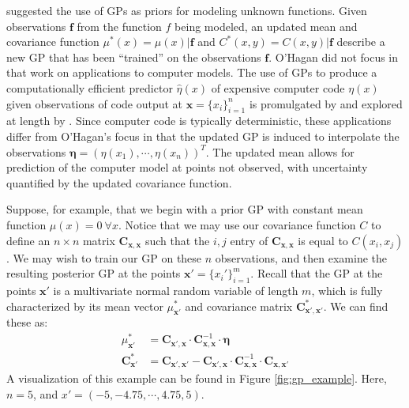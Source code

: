 \documentclass{article}
\begin{document}

\cite{OHagan1978} suggested the use of GPs as priors for modeling unknown functions. Given observations $\mathbf f$ from the function $f$ being modeled, an updated mean and covariance function $\mu^*(x)=\mu(x)|\mathbf f$ and $C^*(x,y) = C(x,y)|\mathbf f$ describe a new GP that has been ``trained'' on the observations $\mathbf f$. O'Hagan did not focus in that work on applications to computer models. The use of GPs to produce a computationally efficient predictor $\hat \eta (x)$ of expensive computer code $\eta(x)$ given observations of code output at $\mathbf x=\{x_i\}_{i=1}^n$ is promulgated by \cite{Sacks1989} and explored at length by \cite{Santner2003a}. Since computer code is typically deterministic, these applications differ from O'Hagan's focus in that the updated GP is induced to interpolate the observations $\boldsymbol \eta = (\eta(x_1),\cdots,\eta(x_n))^T$. The updated mean allows for prediction of the computer model at points not observed, with uncertainty quantified by the updated covariance function.

Suppose, for example, that we begin with a prior GP with constant mean function $\mu(x)=0\ \forall x$. Notice that we may use our covariance function $C$ to define an $n\times n$ matrix $\mathbf C_{\mathbf x,\mathbf x}$ such that the $i,j$ entry of $\mathbf C_{\mathbf x,\mathbf x}$ is equal to $C(x_i,x_j)$. We may wish to train our GP on these $n$ observations, and then examine the resulting posterior GP at the points $\mathbf x'=\{x_i' \}_{i=1}^m$. Recall that the GP at the points $\mathbf x'$ is a multivariate normal random variable of length $m$, which is fully characterized by its mean vector $\mu^*_{\mathbf x'}$ and covariance matrix $\mathbf C^*_{\mathbf x',\mathbf x'}$. We can find these as:
\begin{equation}\label{eq:post_gp}\begin{split}
\mu^*_{\mathbf x'}&=\mathbf C_{\mathbf x',\mathbf x}\cdot \mathbf C_{\mathbf x,\mathbf x} ^{-1}\cdot \boldsymbol \eta
\\
\mathbf C^*_{\mathbf x'}&=\mathbf C_{\mathbf x',\mathbf x'}-\mathbf C_{\mathbf x',\mathbf x}\cdot \mathbf C_{\mathbf x,\mathbf x}^{-1}\cdot \mathbf C_{\mathbf x,\mathbf x'}
\end{split}\end{equation}
A visualization of this example can be found in Figure \ref{fig:gp_example}. Here, $n=5$, and $x'=(-5,-4.75,⋯,4.75,5)$. 
\end{document}

